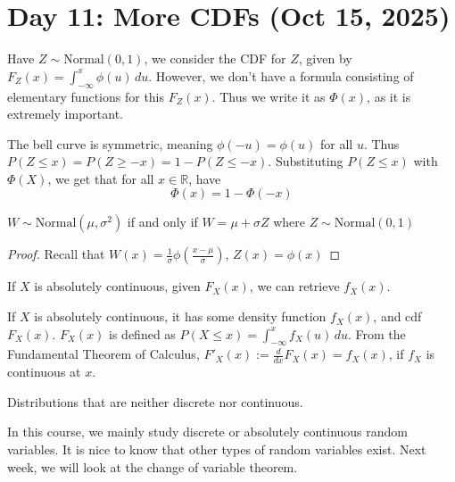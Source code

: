 \section{Day 11: More CDFs (Oct 15, 2025)}

Have $Z \sim \text{Normal}(0, 1)$, we consider the CDF for $Z$, given by $F_Z(x) = \int_{-\infty}^x \phi(u) \, du$. However, we don't have a formula consisting of elementary functions for this $F_Z(x)$. Thus we write it as $\Phi(x)$, as it is extremely important.

The bell curve is symmetric, meaning $\phi(-u) = \phi(u)$ for all $u$. Thus $P(Z \leq x) = P(Z \geq -x) = 1 - P(Z \leq -x)$. Substituting $P(Z \leq x)$ with $\Phi(X)$, we get that for all $x \in \mathbb{R}$, have
\[
\Phi(x) = 1 - \Phi(-x)
\]

\begin{simplethm}
    $W \sim \text{Normal}(\mu, \sigma^2)$ if and only if $W = \mu + \sigma Z$ where $Z \sim \text{Normal}(0, 1)$ 
\end{simplethm}
\begin{proof}
    Recall that $W(x) = \frac{1}{\sigma} \phi(\frac{x - \mu}{\sigma})$, $Z(x) = \phi(x)$
\end{proof}

\begin{simplethm}
    If $X$ is absolutely continuous, given $F_X(x)$, we can retrieve $f_X(x)$.
\end{simplethm}

If $X$ is absolutely continuous, it has some density function $f_X(x)$, and cdf $F_X(x)$. $F_X(x)$ is defined as $P(X \leq x) = \int_{-\infty}^x f_X(u) \, du$. From the Fundamental Theorem of Calculus, $F'_X(x) := \frac{d}{dx} F_X(x) = f_X(x)$, if $f_X$ is continuous at $x$.

\begin{definition}
Distributions that are neither discrete nor continuous.
\end{definition}
\noindent In this course, we mainly study discrete or absolutely continuous random variables. It is nice to know that other types of random variables exist. Next week, we will look at the change of variable theorem.
